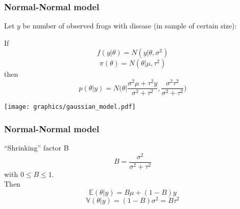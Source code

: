 \documentclass{beamer}
\newcommand{\E}{\mathbb{E}}
\newcommand{\V}{\mathbb{V}}
\newcommand{\1}{\ensuremath{\mathbf{1}}}
\begin{document}
%
%
%
\begin{frame}\frametitle{Normal-Normal model}
	Let $y$ be number of observed frogs with disease (in sample of certain size):
	\begin{block}{}
		If
		\begin{equation}
			f(y|\theta) = N(y|\theta,\sigma^2)
		\end{equation}
		\begin{equation}
			\pi(\theta) = N(\theta|\mu,\tau^2)
		\end{equation}
		then
		\begin{equation}
			p(\theta|y) = N\Big( \theta \Big| \frac{\sigma^2\mu + \tau^2 y}{\sigma^2 + \tau^2}, \frac{\sigma^2\tau^2}{\sigma^2 + \tau^2} \Big)
		\end{equation}
	\end{block}
	\begin{center}
		\texttt{[image: graphics/gaussian\_model.pdf]}
	\end{center}
\end{frame}
%
%
%
\begin{frame}\frametitle{Normal-Normal model}
	\begin{block}{``Shrinking'' factor B}
		\begin{equation}
			B = \frac{\sigma^2}{\sigma^2 + \tau^2}
		\end{equation}
		with $0 \leq B \leq 1$.\\
		Then
		\begin{equation}
			\E(\theta|y) = B \mu + (1-B) y
		\end{equation}
		\begin{equation}
			\V(\theta|y) = (1-B)\sigma^2 = B \tau^2
		\end{equation}
	\end{block}
\end{frame}
\end{document}
